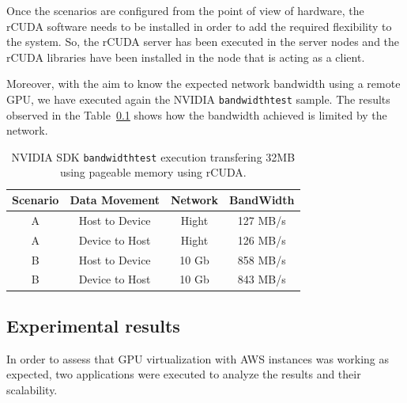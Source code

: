 \documentclass[a4paper,twoside]{article}
\begin{document}
Once the scenarios are configured from the point of view of hardware, 
the {rCUDA} software needs to be installed in order to add 
the required flexibility to the system. So, the {rCUDA} server has been 
executed in the server nodes and the {rCUDA} libraries have been installed 
in the node that is acting as a client.

Moreover, with the aim to know the expected network bandwidth using 
a remote GPU, we have executed again the NVIDIA {\tt bandwidthtest} sample.
The results observed in the Table~\ref{} shows how the bandwidth achieved is limited 
by the network.

\begin{table}[htb]
\renewcommand{\arraystretch}{1.3}
\caption{NVIDIA SDK {\tt bandwidthtest} execution transfering 32MB using pageable memory using {rCUDA}.}
\label{table:bwt}
\tabcolsep=0.09cm
\begin{center}\begin{tabular}{cccc}
Scenario &  Data Movement & Network & BandWidth \\ \hline \hline
A & Host to Device & Hight& 127 MB/s \\ \hline
A & Device to Host & Hight& 126 MB/s\\ \hline
B & Host to Device & 10 Gb& 858 MB/s\\ \hline
B & Device to Host & 10 Gb& 843 MB/s\\ \hline
\end{tabular}\end{center}\end{table}




\subsection{Experimental results}
In order to assess that GPU virtualization with AWS instances was working as expected, two applications were executed to analyze the results and their scalability.
\end{document}
